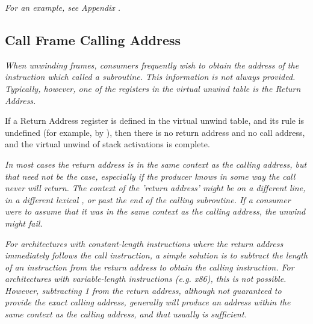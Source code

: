 \textit{For an example, see 
Appendix .}



\subsection{Call Frame Calling Address}
\label{chap:callframecallingaddress}

\textit{When unwinding frames, consumers frequently wish to obtain the
address of the instruction which called a subroutine. This
information is not always provided. Typically, however,
one of the registers in the virtual unwind table is the
Return Address.}

If a Return Address register is defined in the virtual
unwind table, and its rule is undefined (for example, by
), then there is no return address and no
call address, and the virtual unwind of stack activations
is complete.

\textit{In most cases the return address is in the same context as the
calling address, but that need not be the case, especially if
the producer knows in some way the call never will return. The
context of the 'return address' might be on a different line,
in a different lexical , 
or past the end of the calling
subroutine. If a consumer were to assume that it was in the
same context as the calling address, the unwind might fail.}

\textit{For architectures with constant-length instructions where
the return address immediately follows the call instruction,
a simple solution is to subtract the length of an instruction
from the return address to obtain the calling instruction. For
architectures with variable-length instructions (e.g.  x86),
this is not possible. However, subtracting 1 from the return
address, although not guaranteed to provide the exact calling
address, generally will produce an address within the same
context as the calling address, and that usually is sufficient.}



